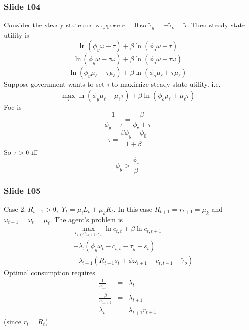 \documentclass[aspectratio=169]{ltx-talk}
\begin{document}
\begin{frame}
\frametitle{Slide 104}
Consider the steady state and suppose $e=0$ so $\tilde{\tau}_{y}=-\tilde{\tau%
}_{o}=\tilde{\tau}.$ Then steady state utility is%
\begin{equation*}
\ln \left( \phi _{y}\omega -\tilde{\tau}\right) +\beta \ln \left( \phi
_{o}\omega +\tilde{\tau}\right)
\end{equation*}
\begin{equation*}
\ln \left( \phi _{y}\omega -\tau \omega \right) +\beta \ln \left( \phi
_{o}\omega +\tau \omega \right)
\end{equation*}
\begin{equation*}
\ln \left( \phi _{y}\mu _{\ell }-\tau \mu _{\ell }\right) +\beta \ln \left(
\phi _{o}\mu _{\ell }+\tau \mu _{\ell }\right)
\end{equation*}%
Suppose government wants to set $\tau $ to maximize steady state utility.
i.e. 
\begin{equation*}
\underset{\tau }{\max }\ln \left( \phi _{y}\mu _{\ell }-\mu _{\ell }\tau
\right) +\beta \ln \left( \phi _{o}\mu _{\ell }+\mu _{\ell }\tau \right)
\end{equation*}%
Foc is 
\begin{equation*}
\frac{1}{\phi _{y}-\tau }=\frac{\beta }{\phi _{o}+\tau }
\end{equation*}%
\begin{equation*}
\tau =\frac{\beta \phi _{y}-\phi _{0}}{1+\beta }
\end{equation*}%
So $\tau >0$ iff%
\begin{equation*}
\phi _{y}>\frac{\phi _{o}}{\beta }
\end{equation*}
\end{frame}

\begin{frame}
\frametitle{Slide 105}
Case 2: $R_{t+1}>0,$ $Y_{t}=\mu _{\ell }L_{t}+\mu _{k}K_{t}$. In this case $%
R_{t+1}=r_{t+1}=\mu _{k}$ and $\omega _{t+1}=\omega _{t}=\mu _{\ell }.$ The
agent's problem is 
\begin{eqnarray*}
&&\underset{c_{t,t},c_{t,t+1},s_{t}}{\max }\ln c_{t,t}+\beta \ln c_{t,t+1} \\
&&+\lambda _{t}\left( \phi _{y}\omega _{t}-c_{t,t}-\tilde{\tau}%
_{y}-s_{t}\right) \\
&&+\lambda _{t+1}\left( R_{t+1}s_{t}+\phi \omega _{t+1}-c_{t,t+1}-\tilde{\tau%
}_{o}\right)
\end{eqnarray*}%
Optimal consumption requires 
\begin{eqnarray*}
\frac{1}{c_{t,t}} &=&\lambda _{t} \\
\frac{\beta }{c_{t,t+1}} &=&\lambda _{t+1} \\
\lambda _{t} &=&\lambda _{t+1}r_{t+1}
\end{eqnarray*}%
(since $r_{t}=R_{t}$).
\end{frame}
\end{document}
